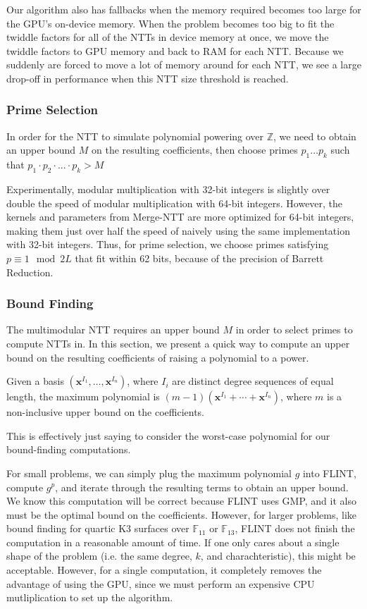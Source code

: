 Our algorithm also has fallbacks when the memory required becomes too large for the 
GPU's on-device memory.
When the problem becomes too big to fit the twiddle factors for 
all of the NTTs
in device memory at once, we move the twiddle factors to GPU memory and 
back to RAM for each NTT. Because we suddenly are forced to move a lot 
of memory around for each NTT, we see a large drop-off in 
performance when this 
NTT size threshold is reached. 


\subsubsection{Prime Selection}
In order for the NTT to simulate polynomial powering over $\mathbb{Z}$, 
we need to obtain an upper bound $M$ on the resulting coefficients, then 
choose primes $p_1 \dots p_k$ such that $p_1 \cdot p_2 \cdot ... \cdot p_k > M$

Experimentally, modular multiplication with 32-bit integers 
is slightly over double the speed of modular 
multiplication with 64-bit integers. 
However, the kernels and parameters from Merge-NTT are more 
optimized for 64-bit integers, making them just over half the
speed of naively using the same implementation with 32-bit 
integers. Thus, for prime selection, 
we choose primes satisfying $p \equiv 1 \mod 2L$ that fit 
within 62 bits, because of the precision of Barrett Reduction.

\subsubsection{Bound Finding}
The multimodular NTT requires an upper bound $M$ in order to select primes 
to compute NTTs in. In this section, we present a quick way to compute an 
upper bound on the resulting coefficients of raising a polynomial to a power.

\begin{defn}
    Given a basis $(\mathbf{x}^{I_1}, \dots, \mathbf{x}^{I_n})$, where $I_i$ are distinct degree sequences of equal length, the maximum polynomial is $(m - 1)(\mathbf{x}^{I_1} + \cdots + \mathbf{x}^{I_n})$, where $m$ is a non-inclusive upper bound on the coefficients.
\end{defn}

This is effectively just saying to consider the worst-case polynomial 
for our bound-finding computations.

For small problems, we can simply plug the maximum polynomial $g$ into FLINT, compute $g ^ p$, and 
iterate through the resulting terms to obtain an upper bound.
We know this computation will be correct because FLINT uses GMP,
and it also must be the optimal bound on the coefficients. 
However, for larger problems, like bound finding for quartic K3 surfaces over $\mathbb{F}_{11}$ or $\mathbb{F}_{13}$, FLINT does not finish the computation in a reasonable amount of time.
If one only cares about a single shape of the problem (i.e. the same degree, \(k\), and charachteristic),
this might be acceptable.
However, for a single computation, it completely removes the advantage of using the GPU,
since we must perform an expensive CPU mutliplication to set up the algorithm.

